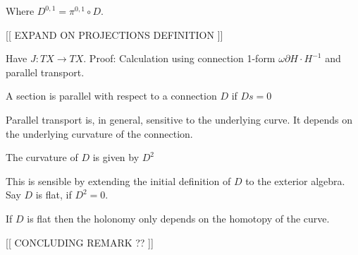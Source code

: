 Where $ D^{0,1} = \pi^{0,1} \circ D$.

[[ EXPAND ON PROJECTIONS DEFINITION ]] 

Have $ J : TX \rightarrow TX $. 
Proof: 
Calculation using connection 1-form $ \omega \partial H \cdot H^{-1}$
and parallel transport. 

\begin{definition}
    A section is parallel with respect to a connection $ D$ if $Ds = 0 $
\end{definition}

Parallel transport is, in general, sensitive to the underlying curve. 
It depends on the underlying curvature of the connection. 

\begin{definition}
    The curvature of $D$ is given by $D^2$ 
\end{definition}
This is sensible by extending the initial definition of $ D$ to the exterior algebra. 
Say $D$ is flat, if $ D^2 = 0 $. 

\begin{theorem}
    If $D$ is flat then the holonomy only depends on the homotopy of the curve. 
\end{theorem}

[[ CONCLUDING REMARK ?? ]] 





 


